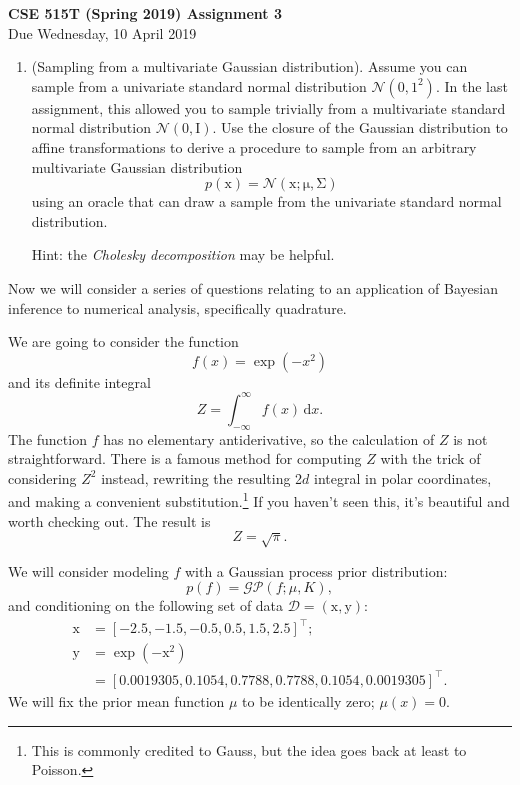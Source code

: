 \documentclass{article}
\newcommand{\mc}[1]{\mathcal{#1}}
\newcommand{\data}{\mc{D}}
\newcommand{\trans}{^\top}
\newcommand{\intd}[1]{\,\mathrm{d}{#1}}
\newcommand{\mat}[1]{\bm{\mathrm{#1}}}
\renewcommand{\vec}[1]{\bm{\mathrm{#1}}}
\begin{document}
{\large \textbf{CSE 515T (Spring 2019) Assignment 3}} \\
Due Wednesday, 10 April 2019 \\

\begin{enumerate}
\item
  (Sampling from a multivariate Gaussian distribution).  Assume you can sample
  from a univariate standard normal distribution $\mc{N}(0, 1^2)$.  In the last
  assignment, this allowed you to sample trivially from a multivariate standard
  normal distribution $\mc{N}(\vec{0}, \mat{I})$.  Use the closure of the
  Gaussian distribution to affine transformations to derive a procedure to
  sample from an arbitrary multivariate Gaussian distribution
  \[
    p(\vec{x}) = \mc{N}(\vec{x}; \vec{\mu}, \mat{\Sigma})
  \]
  using an oracle that can draw a sample from the univariate standard normal
  distribution.

  Hint: the \emph{Cholesky decomposition} may be helpful.
\end{enumerate}

\clearpage
Now we will consider a series of questions relating to an application of
Bayesian inference to numerical analysis, specifically quadrature.

We are going to consider the function
\[f(x) = \exp(-x^2)\]
and its definite integral
\[Z = \int_{-\infty}^\infty f(x) \intd x.\]
The function $f$ has no elementary antiderivative, so the calculation of $Z$ is
not straightforward. There is a famous method for computing $Z$ with the trick
of considering $Z^2$ instead, rewriting the resulting 2$d$ integral in polar
coordinates, and making a convenient substitution.\footnote{This is commonly
  credited to Gauss, but the idea goes back at least to Poisson.} If you haven't
seen this, it's beautiful and worth checking out. The result is
\[Z = \sqrt{\pi}.\]

We will consider modeling $f$ with a Gaussian process prior distribution:
\[p(f) = \mc{GP}(f; \mu, K),\]
and conditioning on the following set of data $\data = (\vec{x}, \vec{y})$:
\begin{align*}
  \vec{x} &= [-2.5, -1.5, -0.5, 0.5, 1.5, 2.5]\trans; \\
  \vec{y} &= \exp(-\vec{x}^2) \\
          &= [0.0019305, 0.1054, 0.7788, 0.7788, 0.1054, 0.0019305]\trans.
\end{align*}
We will fix the prior mean function $\mu$ to be identically zero; $\mu(x) = 0$.
\end{document}
